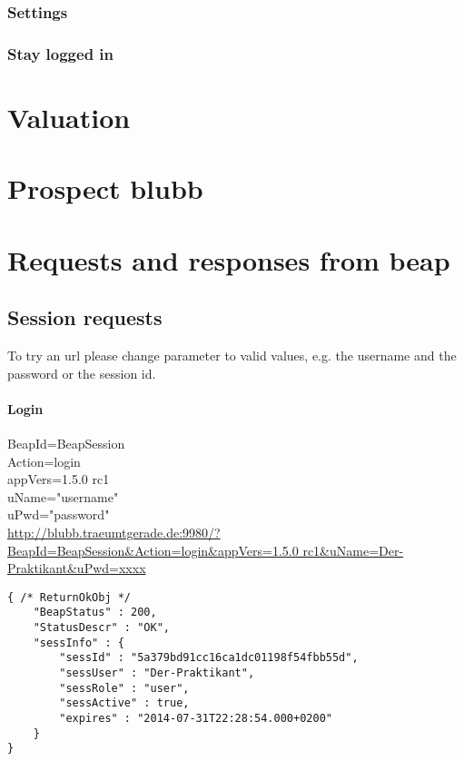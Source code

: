 \documentclass[12pt,a4paper,oneside]{report}
\begin{document}
\subsection{Settings}

\subsection{Stay logged in}

\chapter{Valuation}

\chapter{Prospect blubb}

\printbibliography
%

\appendix
\chapter{Requests and responses from beap}
\lstset{language=JavaScript}
\section{Session requests}
To try an url please change parameter to valid values, e.g. the username and the password or the session id.
\subsubsection{Login}
BeapId=BeapSession\\
Action=login\\
appVers=1.5.0 rc1\\
uName="username"\\
uPwd="password"\\
\url{http://blubb.traeumtgerade.de:9980/?BeapId=BeapSession&Action=login&appVers=1.5.0 rc1&uName=Der-Praktikant&uPwd=xxxx}
\lstset{language=JavaScript}
\begin{lstlisting}
{ /* ReturnOkObj */
    "BeapStatus" : 200,
    "StatusDescr" : "OK",
    "sessInfo" : { 
        "sessId" : "5a379bd91cc16ca1dc01198f54fbb55d",
        "sessUser" : "Der-Praktikant",
        "sessRole" : "user",
        "sessActive" : true,
        "expires" : "2014-07-31T22:28:54.000+0200"
    }
}
\end{lstlisting}
\clearpage
\end{document}
